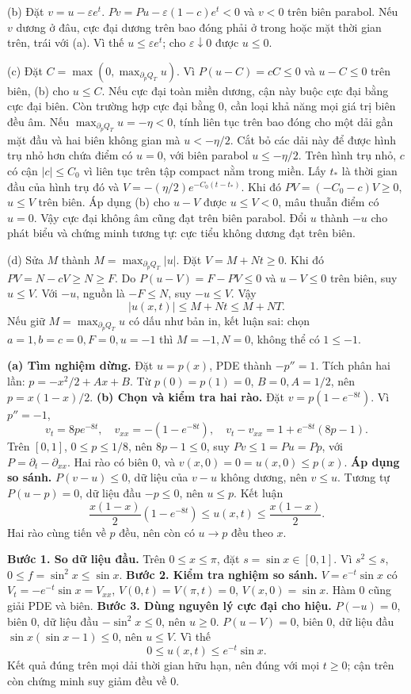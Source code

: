 (b) Đặt $v=u-\varepsilon e^t$. $Pv=Pu-\varepsilon(1-c)e^t<0$ và $v<0$ trên biên parabol. Nếu $v$ dương ở đâu, cực đại dương trên bao đóng phải ở trong hoặc mặt thời gian trên, trái với (a). Vì thế $u\le\varepsilon e^t$; cho $\varepsilon\downarrow0$ được $u\le0$.

(c) Đặt $C=\max(0,\max_{\partial_pQ_T}u)$. Vì $P(u-C)=cC\le0$ và $u-C\le0$ trên biên, (b) cho $u\le C$. Nếu cực đại toàn miền dương, cận này buộc cực đại bằng cực đại biên. Còn trường hợp cực đại bằng $0$, cần loại khả năng mọi giá trị biên đều âm.
Nếu $\max_{\partial_pQ_T}u=-\eta<0$, tính liên tục trên bao đóng cho một dải gần mặt đầu và hai biên không gian mà $u<-\eta/2$. Cắt bỏ các dải này để được hình trụ nhỏ hơn chứa điểm có $u=0$, với biên parabol $u\le-\eta/2$. Trên hình trụ nhỏ, $c$ có cận $|c|\le C_0$ vì liên tục trên tập compact nằm trong miền. Lấy $t_*$ là thời gian đầu của hình trụ đó và $V=-(\eta/2)e^{-C_0(t-t_*)}$. Khi đó $PV=(-C_0-c)V\ge0$, $u\le V$ trên biên. Áp dụng (b) cho $u-V$ được $u\le V<0$, mâu thuẫn điểm có $u=0$. Vậy cực đại không âm cũng đạt trên biên parabol. Đổi $u$ thành $-u$ cho phát biểu và chứng minh tương tự: cực tiểu không dương đạt trên biên.

(d) Sửa $M$ thành $M=\max_{\partial_pQ_T}|u|$. Đặt $V=M+Nt\ge0$. Khi đó $PV=N-cV\ge N\ge F$. Do $P(u-V)=F-PV\le0$ và $u-V\le0$ trên biên, suy $u\le V$. Với $-u$, nguồn là $-F\le N$, suy $-u\le V$. Vậy
\[|u(x,t)|\le M+Nt\le M+NT.\]
Nếu giữ $M=\max_{\partial_pQ_T}u$ có dấu như bản in, kết luận sai: chọn $a=1,b=c=0,F=0,u=-1$ thì $M=-1,N=0$, không thể có $1\le-1$.

\textbf{(a) Tìm nghiệm dừng.} Đặt $u=p(x)$, PDE thành $-p''=1$. Tích phân hai lần: $p=-x^2/2+Ax+B$. Từ $p(0)=p(1)=0$, $B=0,A=1/2$, nên $p=x(1-x)/2$.
\textbf{(b) Chọn và kiểm tra hai rào.} Đặt $v=p(1-e^{-8t})$. Vì $p''=-1$,
\[v_t=8pe^{-8t},\quad v_{xx}=-(1-e^{-8t}),\quad
v_t-v_{xx}=1+e^{-8t}(8p-1).\]
Trên $[0,1]$, $0\le p\le1/8$, nên $8p-1\le0$, suy $Pv\le1=Pu= Pp$, với $P=\partial_t-\partial_{xx}$. Hai rào có biên $0$, và $v(x,0)=0=u(x,0)\le p(x)$.
\textbf{Áp dụng so sánh.} $P(v-u)\le0$, dữ liệu của $v-u$ không dương, nên $v\le u$. Tương tự $P(u-p)=0$, dữ liệu đầu $-p\le0$, nên $u\le p$. Kết luận
\[\frac{x(1-x)}2(1-e^{-8t})\le u(x,t)\le\frac{x(1-x)}2.\]
Hai rào cùng tiến về $p$ đều, nên còn có $u\to p$ đều theo $x$.

\textbf{Bước 1. So dữ liệu đầu.} Trên $0\le x\le\pi$, đặt $s=\sin x\in[0,1]$. Vì $s^2\le s$, $0\le f=\sin^2x\le\sin x$.
\textbf{Bước 2. Kiểm tra nghiệm so sánh.} $V=e^{-t}\sin x$ có $V_t=-e^{-t}\sin x=V_{xx}$, $V(0,t)=V(\pi,t)=0$, $V(x,0)=\sin x$. Hàm $0$ cũng giải PDE và biên.
\textbf{Bước 3. Dùng nguyên lý cực đại cho hiệu.} $P(-u)=0$, biên $0$, dữ liệu đầu $-\sin^2x\le0$, nên $u\ge0$. $P(u-V)=0$, biên $0$, dữ liệu đầu $\sin x(\sin x-1)\le0$, nên $u\le V$. Vì thế
\[0\le u(x,t)\le e^{-t}\sin x.\]
Kết quả đúng trên mọi dải thời gian hữu hạn, nên đúng với mọi $t\ge0$; cận trên còn chứng minh suy giảm đều về $0$.

